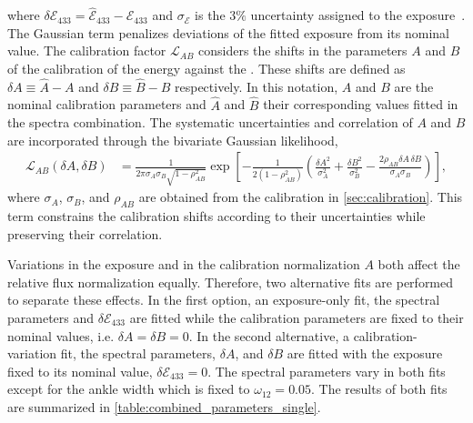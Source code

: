 \documentclass[main.tex]{subfiles}
\begin{document}
\noindent where $\delta\mathcal E_{433}=\widehat{\mathcal E}_{433}-\mathcal E_{433}$ and $\sigma_{\mathcal E}$ is the $3\%$ uncertainty assigned to the  exposure~\cite{PierreAuger:2010:TriggerAperture}.
The Gaussian term penalizes deviations of the fitted exposure from its nominal value.
The calibration factor $ \mathcal{L}_{AB}$ considers the shifts in the parameters $A$ and $B$ of the calibration of the  energy against the .
These shifts are defined as  $\delta A\equiv\widehat A-A$ and  $\delta B\equiv\widehat B-B$ respectively. 
In this notation, $A$ and $B$ are the nominal calibration parameters and $\widehat A$ and $\widehat B$ their corresponding values fitted in the spectra combination.
The systematic uncertainties and correlation of $A$ and $B$ are incorporated through the bivariate Gaussian likelihood,
\begin{align}
\mathcal L_{AB}(\delta A,\delta B)
&=
\frac{1}{2\pi\sigma_A\sigma_B\sqrt{1-\rho_{AB}^{2}}}
\exp\left[
-\frac{1}{2(1-\rho_{AB}^{2})}
\left(
\frac{\delta A^{2}}{\sigma_A^{2}}
+\frac{\delta B^{2}}{\sigma_B^{2}}
-\frac{2\rho_{AB}\delta A\,\delta B}{\sigma_A\sigma_B}
\right)
\right],
\end{align}
\noindent where $\sigma_A$, $\sigma_B$, and $\rho_{AB}$ are obtained from the calibration in \cref{sec:calibration}.
This term constrains the calibration shifts according to their uncertainties while preserving their correlation.

Variations in the  exposure and in the calibration normalization $A$ both affect the relative flux normalization equally.
Therefore, two alternative fits are performed to separate these effects.
In the first option, an exposure-only fit, the spectral parameters and $\delta\mathcal E_{433}$ are fitted while the calibration parameters are fixed to their nominal values, i.e. $\delta A=\delta B=0$.
In the second alternative, a calibration-variation fit, the spectral parameters, $\delta A$, and $\delta B$ are fitted with the exposure fixed to its nominal value, $\delta\mathcal E_{433}=0$.
The spectral parameters vary in both fits except for the ankle width which is fixed to $\omega_{12}=0.05$.
The results of both fits are summarized in \cref{table:combined_parameters_single}.
\end{document}
